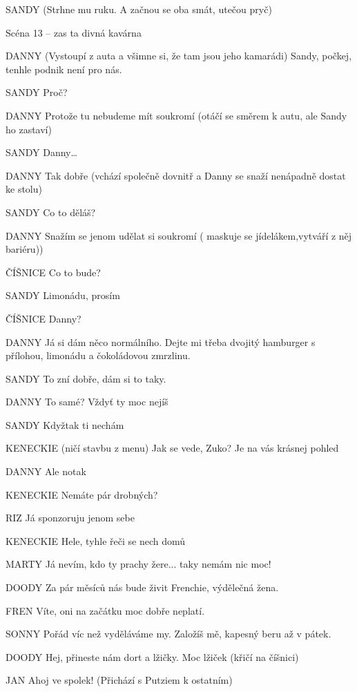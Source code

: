SANDY        (Strhne mu ruku. A začnou se oba smát, utečou pryč) 

Scéna 13 – zas ta divná kavárna 

DANNY         (Vystoupí z auta a všimne si, že tam jsou jeho kamarádi) Sandy, počkej,           tenhle podnik není pro nás. 

SANDY         Proč? 

DANNY        Protože tu nebudeme mít soukromí (otáčí se směrem k autu, ale Sandy         ho zastaví) 

SANDY        Danny… 

DANNY         Tak dobře (vchází společně dovnitř a Danny se snaží nenápadně dostat         ke stolu) 

SANDY         Co to děláš? 

DANNY         Snažím se jenom udělat si soukromí ( maskuje se jídelákem,vytváří z něj bariéru))

ČÍŠNICE         Co to bude? 

SANDY        Limonádu, prosím 

ČÍŠNICE         Danny? 

DANNY        Já si dám něco normálního. Dejte mi třeba dvojitý hamburger s přílohou,         limonádu a čokoládovou zmrzlinu. 

SANDY        To zní dobře, dám si to taky. 

DANNY         To samé? Vždyť ty moc nejíš 

SANDY         Kdyžtak ti nechám 

KENECKIE        (ničí stavbu z menu) Jak se vede, Zuko? Je na vás krásnej pohled 

DANNY         Ale notak

KENECKIE        Nemáte pár drobných?

RIZ                Já sponzoruju jenom sebe 

KENECKIE        Hele, tyhle řeči se nech domů 

MARTY        Já nevím, kdo ty prachy žere... taky nemám nic moc! 

DOODY        Za pár měsíců nás bude živit Frenchie, výdělečná žena. 

FREN        Víte, oni na začátku moc dobře neplatí. 

SONNY        Pořád víc než vyděláváme my. Založíš mě, kapesný beru až v pátek. 

DOODY         Hej, přineste nám dort a  lžičky.  Moc lžiček (křičí na číšnici) 

JAN         Ahoj ve spolek! (Přichází s Putziem k ostatním) 

